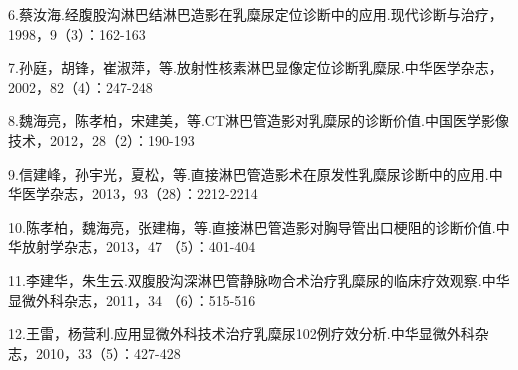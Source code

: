 6.蔡汝海.经腹股沟淋巴结淋巴造影在乳糜尿定位诊断中的应用.现代诊断与治疗，1998，9（3）：162-163

7.孙庭，胡锋，崔淑萍，等.放射性核素淋巴显像定位诊断乳糜尿.中华医学杂志，2002，82（4）：247-248

8.魏海亮，陈孝柏，宋建美，等.CT淋巴管造影对乳糜尿的诊断价值.中国医学影像技术，2012，28（2）：190-193

9.信建峰，孙宇光，夏松，等.直接淋巴管造影术在原发性乳糜尿诊断中的应用.中华医学杂志，2013，93（28）：2212-2214

10.陈孝柏，魏海亮，张建梅，等.直接淋巴管造影对胸导管出口梗阻的诊断价值.中华放射学杂志，2013，47
（5）：401-404

11.李建华，朱生云.双腹股沟深淋巴管静脉吻合术治疗乳糜尿的临床疗效观察.中华显微外科杂志，2011，34
（6）：515-516

12.王雷，杨营利.应用显微外科技术治疗乳糜尿102例疗效分析.中华显微外科杂志，2010，33（5）：427-428

\protect\hypertarget{text00288.html}{}{}

